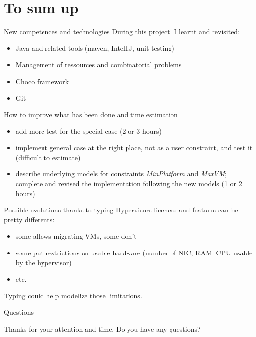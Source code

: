 \documentclass{beamer}
\begin{document}
\section{To sum up}
\begin{frame}{New competences and technologies}
During this project, I learnt and revisited:
\begin{itemize}
	\item Java and related tools (maven, IntelliJ, unit testing)
	\item Management of ressources and combinatorial problems
	\item Choco framework
	\item Git
\end{itemize}
\end{frame}
\begin{frame}{How to improve what has been done and time estimation}
\begin{itemize}
	\item add more test for the special case (2 or 3 hours)
	\item implement general case at the right place, not
		as a user constraint, and test it (difficult to estimate)
	\item describe underlying models for constraints \textit{MinPlatform}
		and \textit{MaxVM}; complete and revised the implementation
		following the new models (1 or 2 hours)
\end{itemize}
\end{frame}
\begin{frame}{Possible evolutions thanks to typing}
Hypervisors licences and features can be pretty differents:
\begin{itemize}
	\item some allows migrating VMs, some don't
	\item some put restrictions on usable hardware (number of NIC, RAM, CPU usable
		by the hypervisor)
	\item etc.
\end{itemize}
Typing could help modelize those limitations.
\end{frame}

\begin{frame}{Questions}
\begin{center}
Thanks for your attention and time. Do you have any questions?
\end{center}
\end{frame}

\end{document}
